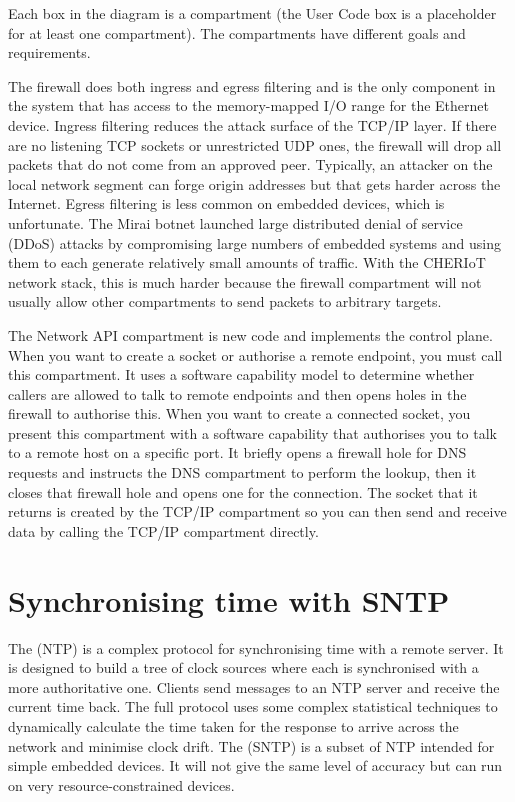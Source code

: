 Each box in the diagram is a compartment (the User Code box is a placeholder for at least one compartment).
The compartments have different goals and requirements.

The firewall does both ingress and egress filtering and is the only component in the system that has access to the memory-mapped I/O range for the Ethernet device.
Ingress filtering reduces the attack surface of the TCP/IP layer.
If there are no listening TCP sockets or unrestricted UDP ones, the firewall will drop all packets that do not come from an approved peer.
Typically, an attacker on the local network segment can forge origin addresses but that gets harder across the Internet.
Egress filtering is less common on embedded devices, which is unfortunate.
The Mirai botnet launched large distributed denial of service (DDoS) attacks by compromising large numbers of embedded systems and using them to each generate relatively small amounts of traffic.
With the CHERIoT network stack, this is much harder because the firewall compartment will not usually allow other compartments to send packets to arbitrary targets.

The Network API compartment is new code and implements the control plane.
When you want to create a socket or authorise a remote endpoint, you must call this compartment.
It uses a software capability model to determine whether callers are allowed to talk to remote endpoints and then opens holes in the firewall to authorise this.
When you want to create a connected socket, you present this compartment with a software capability that authorises you to talk to a remote host on a specific port.
It briefly opens a firewall hole for DNS requests and instructs the DNS compartment to perform the lookup, then it closes that firewall hole and opens one for the connection.
The socket that it returns is created by the TCP/IP compartment so you can then send and receive data by calling the TCP/IP compartment directly.

\section{Synchronising time with SNTP}

The  (NTP) is a complex protocol for synchronising time with a remote server.
It is designed to build a tree of clock sources where each  is synchronised with a more authoritative one.
Clients send messages to an NTP server and receive the current time back.
The full protocol uses some complex statistical techniques to dynamically calculate the time taken for the response to arrive across the network and minimise clock drift.
The  (SNTP) is a subset of NTP intended for simple embedded devices.
It will not give the same level of accuracy but can run on very resource-constrained devices.

